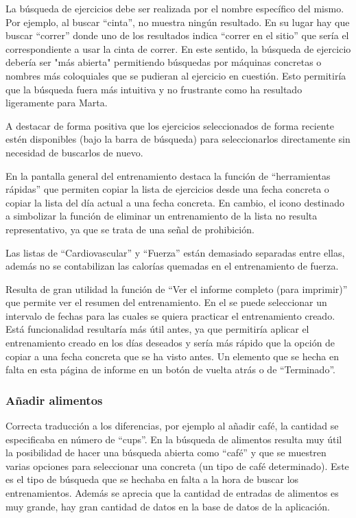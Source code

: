 \documentclass[a4paper]{article}
\begin{document}
			La búsqueda de ejercicios debe ser realizada por el nombre específico del mismo. Por ejemplo, al buscar ``cinta'', no muestra ningún resultado. En su lugar hay que buscar ``correr'' donde uno de los resultados indica ``correr en el sitio'' que sería el correspondiente a usar la cinta de correr. En este sentido, la búsqueda de ejercicio debería ser "más abierta" permitiendo búsquedas por máquinas concretas o nombres más coloquiales que se pudieran al ejercicio en cuestión. Esto permitiría que la búsqueda fuera más intuitiva y no frustrante como ha resultado ligeramente para Marta.
			
			A destacar de forma positiva que los ejercicios seleccionados de forma reciente estén disponibles (bajo la barra de búsqueda) para seleccionarlos directamente sin necesidad de buscarlos de nuevo.
			
			En la pantalla general del entrenamiento destaca la función de ``herramientas rápidas'' que permiten copiar la lista de ejercicios desde una fecha concreta o copiar la lista del día actual a una fecha concreta. En cambio, el icono destinado a simbolizar la función de eliminar un entrenamiento de la lista no resulta representativo, ya que se trata de una señal de prohibición.
			
			Las listas de ``Cardiovascular'' y ``Fuerza'' están demasiado separadas entre ellas, además no se contabilizan las calorías quemadas en el entrenamiento de fuerza.
			
			Resulta de gran utilidad la función de ``Ver el informe completo (para imprimir)'' que permite ver el resumen del entrenamiento. En el se puede seleccionar un intervalo de fechas para las cuales se quiera practicar el entrenamiento creado. Está funcionalidad resultaría más útil antes, ya que permitiría aplicar el entrenamiento creado en los días deseados y sería más rápido que la opción de copiar a una fecha concreta que se ha visto antes. Un elemento que se hecha en falta en esta página de informe en un botón de vuelta atrás o de ``Terminado''.
			
			\subsubsection*{Añadir alimentos}
			
			Correcta traducción a los diferencias, por ejemplo al añadir café, la cantidad se especificaba en número de ``cups''. En la búsqueda de alimentos resulta muy útil la posibilidad de hacer una búsqueda abierta como ``café'' y que se muestren varias opciones para seleccionar una concreta (un tipo de café determinado). Este es el tipo de búsqueda que se hechaba en falta a la hora de buscar los entrenamientos. Además se aprecia que la cantidad de entradas de alimentos es muy grande, hay gran cantidad de datos en la base de datos de la aplicación.
			
\end{document}
